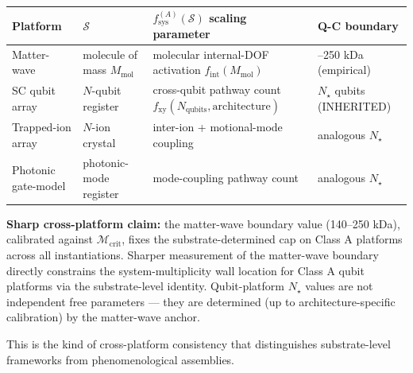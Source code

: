 \documentclass[
  11pt,
  a4paper,
]{article}
\newcounter{none} %
\begin{document}
{\def\LTcaptype{none} %
\begin{longtable}[]{@{}
  >{\raggedright\arraybackslash}p{}
  >{\raggedright\arraybackslash}p{}
  >{\raggedright\arraybackslash}p{}
  >{\raggedright\arraybackslash}p{}@{}}
\toprule\noalign{}
\begin{minipage}[b]{\linewidth}\raggedright
Platform
\end{minipage} & \begin{minipage}[b]{\linewidth}\raggedright
\(\mathcal{S}\)
\end{minipage} & \begin{minipage}[b]{\linewidth}\raggedright
\(f_{\mathrm{sys}}^{(A)}(\mathcal{S})\) scaling parameter
\end{minipage} & \begin{minipage}[b]{\linewidth}\raggedright
Q-C boundary
\end{minipage} \\
\midrule\noalign{}
\endhead
\bottomrule\noalign{}
\endlastfoot
Matter-wave & molecule of mass \(M_{\mathrm{mol}}\) & molecular
internal-DOF activation \(f_{\mathrm{int}}(M_{\mathrm{mol}})\) &
140--250 kDa (empirical) \\
SC qubit array & \(N\)-qubit register & cross-qubit pathway count
\(f_{\mathrm{xy}}(N_{\mathrm{qubits}}, \mathrm{architecture})\) &
\(N_\star\) qubits (INHERITED) \\
Trapped-ion array & \(N\)-ion crystal & inter-ion + motional-mode
coupling & analogous \(N_\star\) \\
Photonic gate-model & photonic-mode register & mode-coupling pathway
count & analogous \(N_\star\) \\
\end{longtable}
}

\textbf{Sharp cross-platform claim:} the matter-wave boundary value
(140--250 kDa), calibrated against \(\mathcal{M}_{\mathrm{crit}}\),
fixes the substrate-determined cap on Class A platforms across all
instantiations. Sharper measurement of the matter-wave boundary directly
constrains the system-multiplicity wall location for Class A qubit
platforms via the substrate-level identity. Qubit-platform \(N_\star\)
values are not independent free parameters --- they are determined (up
to architecture-specific calibration) by the matter-wave anchor.

This is the kind of cross-platform consistency that distinguishes
substrate-level frameworks from phenomenological assemblies.
\end{document}
